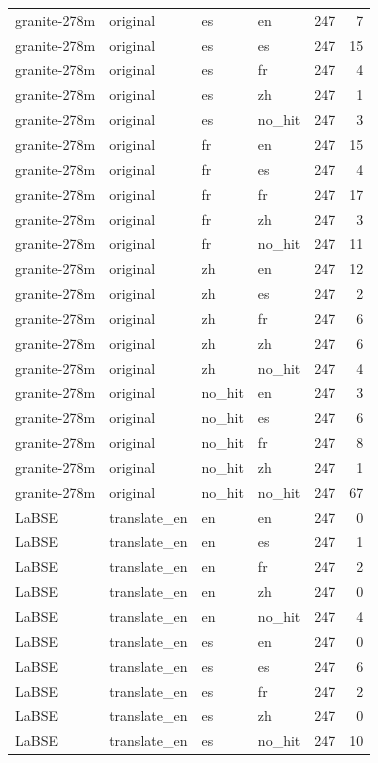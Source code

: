 \begin{tabular}{llllrr}
granite-278m & original & es & en & 247 & 7 \\
granite-278m & original & es & es & 247 & 15 \\
granite-278m & original & es & fr & 247 & 4 \\
granite-278m & original & es & zh & 247 & 1 \\
granite-278m & original & es & no\_hit & 247 & 3 \\
granite-278m & original & fr & en & 247 & 15 \\
granite-278m & original & fr & es & 247 & 4 \\
granite-278m & original & fr & fr & 247 & 17 \\
granite-278m & original & fr & zh & 247 & 3 \\
granite-278m & original & fr & no\_hit & 247 & 11 \\
granite-278m & original & zh & en & 247 & 12 \\
granite-278m & original & zh & es & 247 & 2 \\
granite-278m & original & zh & fr & 247 & 6 \\
granite-278m & original & zh & zh & 247 & 6 \\
granite-278m & original & zh & no\_hit & 247 & 4 \\
granite-278m & original & no\_hit & en & 247 & 3 \\
granite-278m & original & no\_hit & es & 247 & 6 \\
granite-278m & original & no\_hit & fr & 247 & 8 \\
granite-278m & original & no\_hit & zh & 247 & 1 \\
granite-278m & original & no\_hit & no\_hit & 247 & 67 \\
LaBSE & translate\_en & en & en & 247 & 0 \\
LaBSE & translate\_en & en & es & 247 & 1 \\
LaBSE & translate\_en & en & fr & 247 & 2 \\
LaBSE & translate\_en & en & zh & 247 & 0 \\
LaBSE & translate\_en & en & no\_hit & 247 & 4 \\
LaBSE & translate\_en & es & en & 247 & 0 \\
LaBSE & translate\_en & es & es & 247 & 6 \\
LaBSE & translate\_en & es & fr & 247 & 2 \\
LaBSE & translate\_en & es & zh & 247 & 0 \\
LaBSE & translate\_en & es & no\_hit & 247 & 10 \\

\end{tabular}
